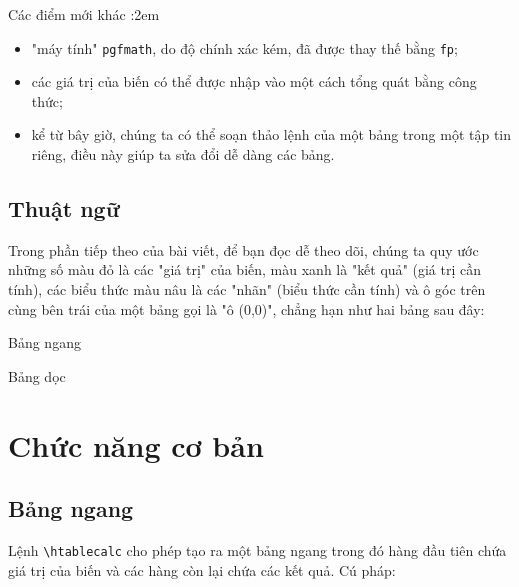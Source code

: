 \documentclass[a4paper,10pt]{article}
\newcommand\verbinline{\lstinline[breaklines=false,basicstyle=\normalsize\ttfamily]}
\begin{document}
Các điểm mới khác :\parindent2em
\begin{itemize}
	\item "máy tính" \verb=pgfmath=, do độ chính xác kém, đã được thay thế bằng \verb=fp=; 
	\item các giá trị của biến có thể được nhập vào một cách tổng quát bằng công thức;
	\item kể từ bây giờ, chúng ta có thể soạn thảo lệnh của một bảng trong một tập tin riêng, điều này giúp ta sửa đổi dễ dàng các bảng.
\end{itemize}\parindent0pt

\subsection{Thuật ngữ}
Trong phần tiếp theo của bài viết, để bạn đọc dễ theo dõi, chúng ta quy ước những số màu đỏ là các "{\color{red}giá trị}" của biến, màu xanh là "{\color{blue}kết quả}" (giá trị cần tính), các biểu thức màu nâu là các "{\color{brown}nhãn}" (biểu thức cần tính) và ô góc trên cùng bên trái của một bảng gọi là "ô (0,0)", chẳng hạn như hai bảng sau đây: 

\begin{minipage}{0.5\linewidth}
\begin{center}
{\scriptsize Bảng ngang}\par\nobreak\smallskip
\def\tcprintvalue#1{\color{red}$#1$}
\def\tcprintresult#1#2{\color{blue}$#1$}
\end{center}
\end{minipage}%
\begin{minipage}{0.5\linewidth}
\begin{center}
{\scriptsize Bảng dọc}\par\nobreak\smallskip
\def\tcprintvalue#1{\color{red}$#1$}
\def\tcprintresult#1#2{\color{blue}$#1$}
\end{center}
\end{minipage}

\section{Chức năng cơ bản}
\subsection{Bảng ngang} \label{bangngang}
Lệnh \verbinline|\htablecalc| cho phép tạo ra một bảng ngang trong đó hàng đầu tiên chứa giá trị của biến và các hàng còn lại chứa các kết quả. Cú pháp:\smallskip
\end{document}
